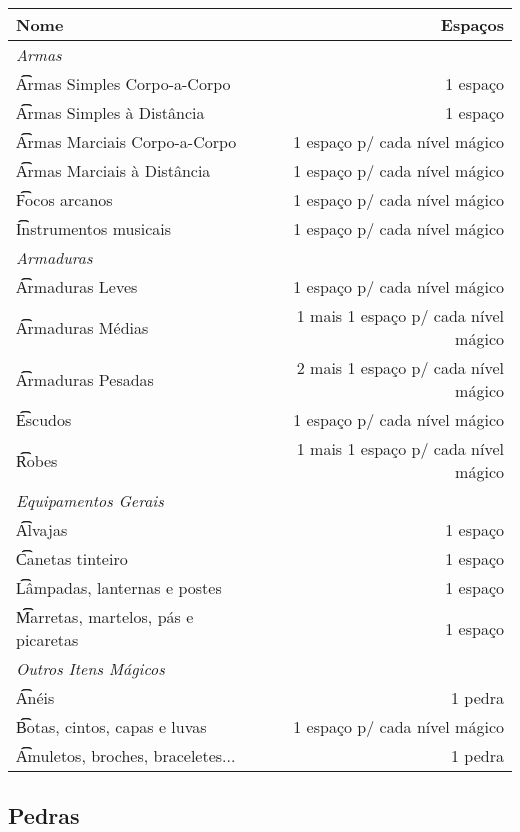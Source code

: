 \begin{center}
\begin{tabular}{lr}
    \textbf{Nome} & \textbf{Espaços} \\
    \hline
    \multicolumn{2}{l}{\t\textit{Armas}} \\
    \t\t Armas Simples Corpo-a-Corpo & 1 espaço \\
    \t\t Armas Simples à Distância & 1 espaço \\
    \t\t Armas Marciais Corpo-a-Corpo & 1 espaço p/ cada nível mágico \\
    \t\t Armas Marciais à Distância & 1 espaço p/ cada nível mágico \\
    \t\t Focos arcanos & 1 espaço p/ cada nível mágico \\
    \t\t Instrumentos musicais & 1 espaço p/ cada nível mágico \\
    \hline
    \multicolumn{2}{l}{\t\textit{Armaduras}} \\
    \t\t Armaduras Leves & 1 espaço p/ cada nível mágico \\
    \t\t Armaduras Médias & 1 mais 1 espaço p/ cada nível mágico \\
    \t\t Armaduras Pesadas & 2 mais 1 espaço p/ cada nível mágico \\
    \t\t Escudos & 1 espaço p/ cada nível mágico \\
    \t\t Robes & 1 mais 1 espaço p/ cada nível mágico \\
    \hline
    \multicolumn{2}{l}{\t\textit{Equipamentos Gerais}} \\
    \t\t Alvajas & 1 espaço \\
    \t\t Canetas tinteiro & 1 espaço \\
    \t\t Lâmpadas, lanternas e postes & 1 espaço \\
    \t\t Marretas, martelos, pás e picaretas & 1 espaço \\
    \hline
    \multicolumn{2}{l}{\t\textit{Outros Itens Mágicos}} \\
    \t\t Anéis & 1 pedra \\
    \t\t Botas, cintos, capas e luvas & 1 espaço p/ cada nível mágico \\
    \t\t Amuletos, broches, braceletes... & 1 pedra \\

\end{tabular}
\end{center}

\subsection*{Pedras}%

